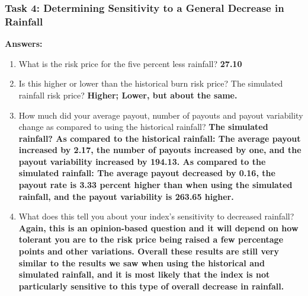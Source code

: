 \documentclass[letterpaper,10pt,english]{sphinxmanual}
\begin{document}
\subsubsection{Task 4:  Determining Sensitivity to a General Decrease in Rainfall}
\label{wiiet/wiiet_initialtomarketpricinganskey:task-4-determining-sensitivity-to-a-general-decrease-in-rainfall}
\textbf{Answers:}
\begin{enumerate}
\item {} 
What is the risk price for the five percent less rainfall?  \textbf{27.10}

\item {} 
Is this higher or lower than the historical burn risk price? The simulated rainfall risk price? \textbf{Higher; Lower, but about the same.}

\item {} 
How much did your average payout, number of payouts and payout variability change as compared to using the historical rainfall?  \textbf{The simulated rainfall? As compared to the historical rainfall: The average payout increased by 2.17, the number of payouts increased by one, and the payout variability increased by 194.13. As compared to the simulated rainfall: The average payout decreased by 0.16, the payout rate is 3.33 percent higher than when using the simulated rainfall, and the payout variability is 263.65 higher.}

\item {} 
What does this tell you about your index's sensitivity to decreased rainfall? \textbf{Again, this is an opinion-based question and it will depend on how tolerant you are to the risk price being raised a few percentage points and other variations. Overall these results are still very similar to the results we saw when using the historical and simulated rainfall, and it is most likely that the index is not particularly sensitive to this type of overall decrease in rainfall.}

\end{enumerate}
\end{document}
